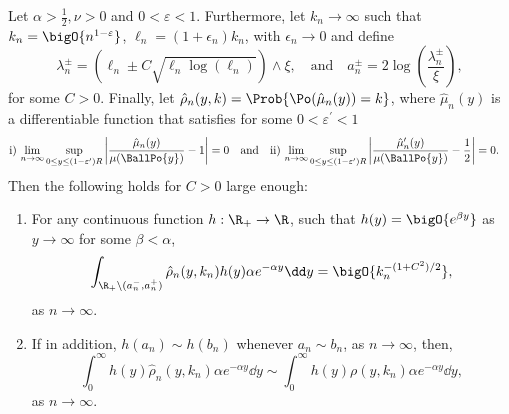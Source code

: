 \begin{lemma}\label{lem:concentration_argument_rho_approximation}
Let $\alpha > \frac{1}{2}, \nu > 0$ and $0 < \varepsilon < 1$. Furthermore, let $k_n \to \infty$ such that $k_n = \bigO{n^{1-\varepsilon}}$, $\ell_n = (1 + \epsilon_n)k_n$, with $\epsilon_n \to 0$ and define
\[
	\lambda_n^\pm = (\ell_n \pm C \sqrt{\ell_n \log(\ell_n)}) \wedge \xi, \quad \text{and} \quad a_n^\pm = 2 \log\left(\frac{\lambda_n^\pm}{\xi}\right),
\] 
for some $C > 0$. Finally, let $\hat{\rho}_n(y,k) = \Prob{\Po(\hat{\mu}_n(y)) = k}$, where $\hat{\mu}_n(y)$ is a differentiable function that satisfies for some $0 < \varepsilon^\prime < 1$
\begin{align*}
	&\mathrm{i)} \, \lim_{n \to \infty} \sup_{0 \le y \le (1 - \varepsilon^\prime)R} 
		\left|\frac{\hat{\mu}_n(y)}{\mu(\BallPo{y})} - 1\right| = 0
	\quad \text{and}
	&&\mathrm{ii)} \, \lim_{n \to \infty}  \sup_{0 \le y \le (1 - \varepsilon^\prime)R} 	
		\left|\frac{\hat{\mu}_n^\prime(y)}{\mu(\BallPo{y})} - \frac{1}{2}\right| = 0.
\end{align*}
Then the following holds for $C > 0$ large enough:
\begin{enumerate}
\item For any continuous function $h : \R_+ \rightarrow  \R$, such that $h(y) = \bigO{e^{\beta y}}$ as $y \to \infty$ for some $\beta < \alpha$, 
\begin{equation}\label{eq:error_bound_int_rho_approx_not_K}
	\int_{\R_+ \setminus (a_n^-, a_n^+)} \hat{\rho}_n(y,k_n) h(y) \alpha e^{-\alpha y} \dd y
	= \bigO{k_n^{-(1+C^2)/2}},
\end{equation}
as $n \to \infty$.
\item If in addition, $h(a_n) \sim h(b_n)$ whenever $a_n \sim b_n$, as $n \to \infty$, then,
\begin{equation}\label{eq:concentration_h_rho_approx}
	\int_0^\infty h(y) \hat{\rho}_n(y,k_n) \alpha e^{-\alpha y} \dd y \sim  
		\int_0^\infty h(y) \rho(y,k_n) \alpha e^{-\alpha y} \dd y,
\end{equation}
as $n \to \infty$.
\end{enumerate}
\end{lemma}

